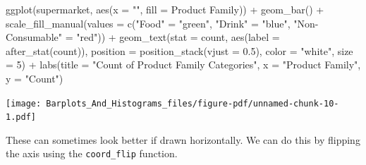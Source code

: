 \documentclass[
  letterpaper,
  DIV=11,
  numbers=noendperiod]{scrreprt}
\newenvironment{Shaded}{\begin{snugshade}}{\end{snugshade}}
\newcommand{\AttributeTok}[1]{\textcolor[rgb]{0.40,0.45,0.13}{#1}}
\newcommand{\DecValTok}[1]{\textcolor[rgb]{0.68,0.00,0.00}{#1}}
\newcommand{\FloatTok}[1]{\textcolor[rgb]{0.68,0.00,0.00}{#1}}
\newcommand{\FunctionTok}[1]{\textcolor[rgb]{0.28,0.35,0.67}{#1}}
\newcommand{\NormalTok}[1]{\textcolor[rgb]{0.00,0.23,0.31}{#1}}
\newcommand{\OtherTok}[1]{\textcolor[rgb]{0.00,0.23,0.31}{#1}}
\newcommand{\SpecialCharTok}[1]{\textcolor[rgb]{0.37,0.37,0.37}{#1}}
\newcommand{\StringTok}[1]{\textcolor[rgb]{0.13,0.47,0.30}{#1}}
\begin{document}
\begin{Shaded}
\begin{Highlighting}[]
\FunctionTok{ggplot}\NormalTok{(supermarket, }\FunctionTok{aes}\NormalTok{(}\AttributeTok{x =} \StringTok{""}\NormalTok{, }\AttributeTok{fill =} \StringTok{\textasciigrave{}}\AttributeTok{Product Family}\StringTok{\textasciigrave{}}\NormalTok{)) }\SpecialCharTok{+}
  \FunctionTok{geom\_bar}\NormalTok{() }\SpecialCharTok{+}
  \FunctionTok{scale\_fill\_manual}\NormalTok{(}\AttributeTok{values =} \FunctionTok{c}\NormalTok{(}\StringTok{"Food"} \OtherTok{=} \StringTok{"green"}\NormalTok{, }\StringTok{"Drink"} \OtherTok{=} \StringTok{"blue"}\NormalTok{, }\StringTok{"Non{-}Consumable"} \OtherTok{=} \StringTok{"red"}\NormalTok{)) }\SpecialCharTok{+}
  \FunctionTok{geom\_text}\NormalTok{(}\AttributeTok{stat =} \StringTok{\textquotesingle{}count\textquotesingle{}}\NormalTok{, }\FunctionTok{aes}\NormalTok{(}\AttributeTok{label =} \FunctionTok{after\_stat}\NormalTok{(count)), }\AttributeTok{position =} \FunctionTok{position\_stack}\NormalTok{(}\AttributeTok{vjust =} \FloatTok{0.5}\NormalTok{), }\AttributeTok{color =} \StringTok{"white"}\NormalTok{, }\AttributeTok{size =} \DecValTok{5}\NormalTok{) }\SpecialCharTok{+}
  \FunctionTok{labs}\NormalTok{(}\AttributeTok{title =} \StringTok{"Count of Product Family Categories"}\NormalTok{,}
       \AttributeTok{x =} \StringTok{"Product Family"}\NormalTok{,}
       \AttributeTok{y =} \StringTok{"Count"}\NormalTok{)}
\end{Highlighting}
\end{Shaded}

\texttt{[image: Barplots\_And\_Histograms\_files/figure-pdf/unnamed-chunk-10-1.pdf]}

These can sometimes look better if drawn horizontally. We can do this by
flipping the axis using the \texttt{coord\_flip} function.
\end{document}

